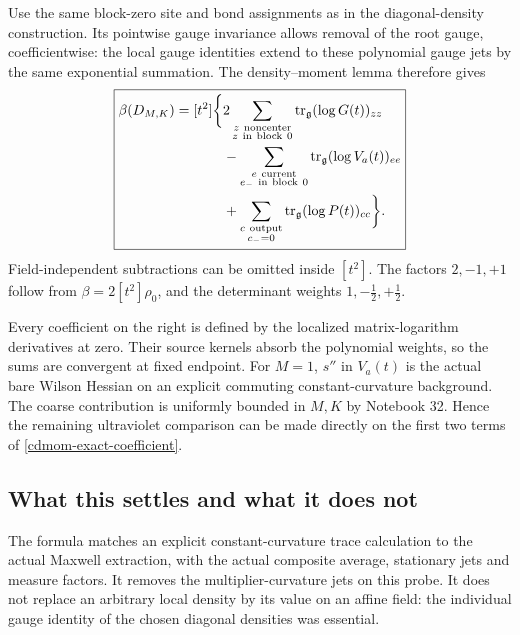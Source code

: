 \documentclass[11pt]{article}
\theoremstyle{remark}
\begin{document}
Use the same block-zero site and bond assignments as
in the diagonal-density construction. Its pointwise
gauge invariance allows removal of the root gauge,
coefficientwise: the local gauge identities extend to
these polynomial gauge jets by the same exponential
summation. The density--moment lemma therefore gives
\begin{equation}
 \boxed{\begin{split}
 \beta(D_{M,K})=[t^2]\bigg\{
 &2\sum_{\substack{z\ {\rm noncenter}\\z\ {\rm in\ block}\ 0}}
                   \operatorname{tr}_{\mathfrak g}(\log G(t))_{zz}\\
 &-\sum_{\substack{e\ {\rm current}\\e_-\ {\rm in\ block}\ 0}}
                   \operatorname{tr}_{\mathfrak g}(\log V_a(t))_{ee}\\
 &+\sum_{\substack{c\ {\rm output}\\c_-=0}}
                   \operatorname{tr}_{\mathfrak g}(\log P(t))_{cc}
                      \bigg\}.
 \end{split}}
 \label{cdmom-exact-coefficient}
\end{equation}
Field-independent subtractions can be omitted inside
\([t^2]\). The factors \(2,-1,+1\) follow from
\(\beta=2[t^2]\rho_0\), and the determinant weights
\(1,-\tfrac12,+\tfrac12\).

Every coefficient on the right is defined by the
localized matrix-logarithm derivatives at zero.
Their source kernels absorb the polynomial weights,
so the sums are convergent at fixed endpoint.
For \(M=1\), \(s''\) in \(V_a(t)\) is the actual bare
Wilson Hessian on an explicit commuting constant-curvature
background. The coarse contribution is uniformly bounded
in \(M,K\) by Notebook 32. Hence the remaining ultraviolet
comparison can be made directly on the first two terms
of \eqref{cdmom-exact-coefficient}.

\subsection{What this settles and what it does not}
\label{cdmom-scope}

The formula matches an explicit constant-curvature trace
calculation to the actual Maxwell extraction, with the
actual composite average, stationary jets and measure
factors. It removes the multiplier-curvature jets on
this probe. It does not replace an arbitrary local
density by its value on an affine field: the individual
gauge identity of the chosen diagonal densities was
essential.
\end{document}
